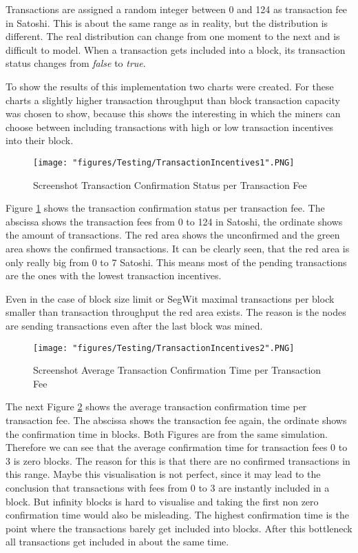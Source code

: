 Transactions are assigned a random integer between 0 and 124 as transaction fee in Satoshi. This is about the same range as in reality, but the distribution is different. The real distribution can change from one moment to the next and is difficult to model. When a transaction gets included into a block, its transaction status changes from \textit{false} to \textit{true}.

To show the results of this implementation two charts were created. For these charts a slightly higher transaction throughput than block transaction capacity was chosen to show, because this shows the interesting in which the miners can choose between including transactions with high or low transaction incentives into their block.

\begin{figure}
\centering
\texttt{[image: "figures/Testing/TransactionIncentives1".PNG]}
\caption{Screenshot Transaction Confirmation Status per Transaction Fee
\label{fig:TransactionIncentives1}}
\end{figure}

Figure \ref{fig:TransactionIncentives1} shows the transaction confirmation status per transaction fee. The abscissa shows the transaction fees from 0 to 124 in Satoshi, the ordinate shows the amount of transactions. The red area shows the unconfirmed and the green area shows the confirmed transactions. It can be clearly seen, that the red area is only really big from 0 to 7 Satoshi. This means most of the pending transactions are the ones with the lowest transaction incentives.

Even in the case of block size limit or SegWit maximal transactions per block smaller than transaction throughput the red area exists. The reason  is the nodes are sending transactions even after the last block was mined.

\begin{figure}
\centering
\texttt{[image: "figures/Testing/TransactionIncentives2".PNG]}
\caption{Screenshot Average Transaction Confirmation Time per Transaction Fee
\label{fig:TransactionIncentives2}}
\end{figure}

The next Figure \ref{fig:TransactionIncentives2} shows the average transaction confirmation time per transaction fee. The abscissa shows the transaction fee again, the ordinate shows the confirmation time in blocks. Both Figures are from the same simulation. Therefore we can see that the average confirmation time for transaction fees 0 to 3 is zero blocks. The reason for this is that there are no confirmed transactions in this range. Maybe this visualisation is not perfect, since it may lead to the conclusion that transactions with fees from 0 to 3 are instantly included in a block. But infinity blocks is hard to visualise and taking the first non zero confirmation time would also be misleading. The highest confirmation time is the point where the transactions barely get included into blocks. After this bottleneck all transactions get included in about the same time.

